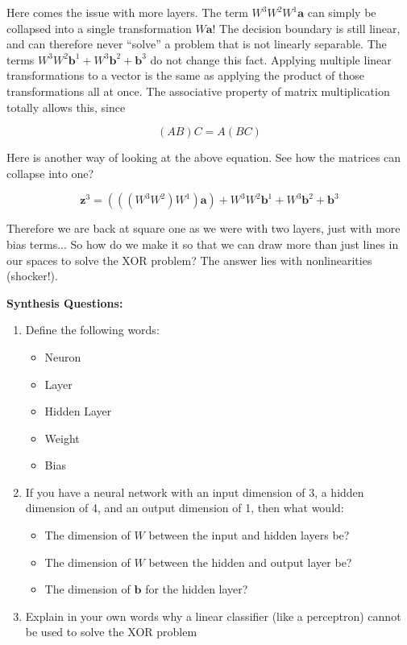 \begin{flushleft}
    Here comes the issue with more layers. The term $W^3W^2W^1\textbf{a}$ can simply be collapsed into a single transformation $W\textbf{a}$! The decision boundary is still linear, and can therefore never ``solve'' a problem that is not linearly separable. The terms $ W^3W^2\textbf{b}^1 + W^3\textbf{b}^2 + \textbf{b}^3$ do not change this fact. Applying multiple linear transformations to a vector is the same as applying the product of those transformations all at once. The associative property of matrix multiplication totally allows this, since

    $$(AB)C = A(BC)$$

    Here is another way of looking at the above equation. See how the matrices can collapse into one?

    $$\textbf{z}^3 = (((W^3W^2)W^1)\textbf{a}) + W^3W^2\textbf{b}^1 + W^3\textbf{b}^2 + \textbf{b}^3$$
    
    Therefore we are back at square one as we were with two layers, just with more bias terms... So how do we make it so that we can draw more than just lines in our spaces to solve the XOR problem? The answer lies with nonlinearities (shocker!).
\end{flushleft}

\begin{questionbox}
\textbf{Synthesis Questions:}
\begin{enumerate}
    \item Define the following words:
    \begin{itemize}
        \item Neuron
        \item Layer
        \item Hidden Layer
        \item Weight
        \item Bias
    \end{itemize}
    \item If you have a neural network with an input dimension of 3, a hidden dimension of 4, and an output dimension of 1, then what would:
    \begin{itemize}
        \item The dimension of $W$ between the input and hidden layers be?
        \item The dimension of $W$ between the hidden and output layer be?
        \item The dimension of $\textbf{b}$ for the hidden layer?
    \end{itemize}
    \item Explain in your own words why a linear classifier (like a perceptron) cannot be used to solve the XOR problem
\end{enumerate}
\end{questionbox}

